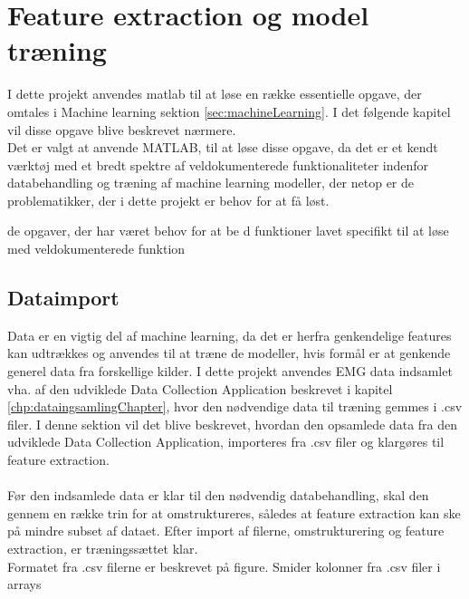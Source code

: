 \thispagestyle{fancy}
\chapter{Feature extraction og model træning}
\label{chp:matlabChapter}
I dette projekt anvendes matlab til at løse en række essentielle opgave, der omtales i Machine learning sektion \ref{sec:machineLearning}. I det følgende kapitel vil disse opgave blive beskrevet nærmere. \\
Det er valgt at anvende MATLAB, til at løse disse opgave, da det er et kendt værktøj med et bredt spektre af veldokumenterede funktionaliteter indenfor databehandling og træning af machine learning modeller, der netop er de problematikker, der i dette projekt er behov for at få løst. 
  
de opgaver, der har været behov for at be d
 funktioner lavet specifikt til at løse 
med veldokumenterede funktion

\section{Dataimport}
Data er en vigtig del af machine learning, da det er herfra genkendelige features kan udtrækkes og anvendes til at træne de modeller, hvis formål er at genkende generel data fra forskellige kilder. I dette projekt anvendes EMG data indsamlet vha. af den udviklede Data Collection Application beskrevet i kapitel \ref{chp:dataingsamlingChapter}, hvor den nødvendige data til træning gemmes i .csv filer. I denne sektion vil det blive beskrevet, hvordan den opsamlede data fra den udviklede Data Collection Application, importeres fra .csv filer og klargøres til feature extraction.
\\\\
Før den indsamlede data er klar til den nødvendig databehandling, skal den gennem en række trin for at omstruktureres, således at feature extraction kan ske på mindre subset af dataet. Efter import af filerne, omstrukturering og feature extraction, er træningssættet klar.  
\\
Formatet fra .csv filerne er beskrevet på figure.
Smider kolonner fra .csv filer i arrays


